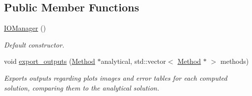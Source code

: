 \subsection*{Public Member Functions}
\begin{DoxyCompactItemize}
\item 
\hyperlink{classIOManager_afce14d2f016545728fee1e48b74f431c}{I\+O\+Manager} ()
\begin{DoxyCompactList}\small\item\em Default constructor. \end{DoxyCompactList}\item 
void \hyperlink{classIOManager_ac4c42d2c5d93f7031447be7845bf2036}{export\+\_\+outputs} (\hyperlink{classMethod}{Method} $\ast$analytical, std\+::vector$<$ \hyperlink{classMethod}{Method} $\ast$ $>$ methods)
\begin{DoxyCompactList}\small\item\em Exports outputs regarding plots images and error tables for each computed solution, comparing them to the analytical solution. \end{DoxyCompactList}\end{DoxyCompactItemize}
